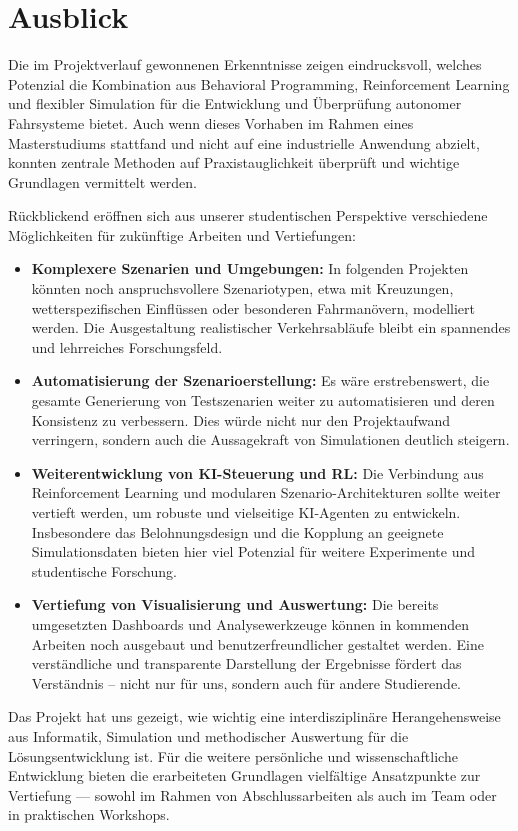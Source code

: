 \chapter{Ausblick}

Die im Projektverlauf gewonnenen Erkenntnisse zeigen eindrucksvoll, welches Potenzial die Kombination aus Behavioral Programming, Reinforcement Learning und flexibler Simulation für die Entwicklung und Überprüfung autonomer Fahrsysteme bietet. Auch wenn dieses Vorhaben im Rahmen eines Masterstudiums stattfand und nicht auf eine industrielle Anwendung abzielt, konnten zentrale Methoden auf Praxistauglichkeit überprüft und wichtige Grundlagen vermittelt werden.

Rückblickend eröffnen sich aus unserer studentischen Perspektive verschiedene Möglichkeiten für zukünftige Arbeiten und Vertiefungen:
\begin{itemize}
    \item \textbf{Komplexere Szenarien und Umgebungen:} In folgenden Projekten könnten noch anspruchsvollere Szenariotypen, etwa mit Kreuzungen, wetterspezifischen Einflüssen oder besonderen Fahrmanövern, modelliert werden. Die Ausgestaltung realistischer Verkehrsabläufe bleibt ein spannendes und lehrreiches Forschungsfeld.
    \item \textbf{Automatisierung der Szenarioerstellung:} Es wäre erstrebenswert, die gesamte Generierung von Testszenarien weiter zu automatisieren und deren Konsistenz zu verbessern. Dies würde nicht nur den Projektaufwand verringern, sondern auch die Aussagekraft von Simulationen deutlich steigern.
    \item \textbf{Weiterentwicklung von KI-Steuerung und RL:} Die Verbindung aus Reinforcement Learning und modularen Szenario-Architekturen sollte weiter vertieft werden, um robuste und vielseitige KI-Agenten zu entwickeln. Insbesondere das Belohnungsdesign und die Kopplung an geeignete Simulationsdaten bieten hier viel Potenzial für weitere Experimente und studentische Forschung.
    \item \textbf{Vertiefung von Visualisierung und Auswertung:} Die bereits umgesetzten Dashboards und Analysewerkzeuge können in kommenden Arbeiten noch ausgebaut und benutzerfreundlicher gestaltet werden. Eine verständliche und transparente Darstellung der Ergebnisse fördert das Verständnis – nicht nur für uns, sondern auch für andere Studierende.
\end{itemize}

Das Projekt hat uns gezeigt, wie wichtig eine interdisziplinäre Herangehensweise aus Informatik, Simulation und methodischer Auswertung für die Lösungsentwicklung ist. Für die weitere persönliche und wissenschaftliche Entwicklung bieten die erarbeiteten Grundlagen vielfältige Ansatzpunkte zur Vertiefung — sowohl im Rahmen von Abschlussarbeiten als auch im Team oder in praktischen Workshops.
